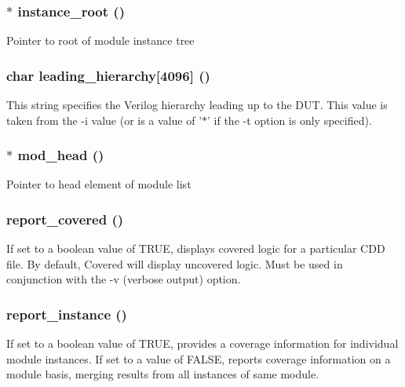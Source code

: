 \subsubsection{$\ast$ instance\_\-root ()}\label{toggle_8c_a0}


Pointer to root of module instance tree 
\subsubsection{\setlength{\rightskip}{0pt plus 5cm}char leading\_\-hierarchy[4096] ()}\label{toggle_8c_a4}


This string specifies the Verilog hierarchy leading up to the DUT. This value is taken from the -i value (or is a value of '$\ast$' if the -t option is only specified). 
\subsubsection{$\ast$ mod\_\-head ()}\label{toggle_8c_a1}


Pointer to head element of module list 
\subsubsection{ report\_\-covered ()}\label{toggle_8c_a2}


If set to a boolean value of TRUE, displays covered logic for a particular CDD file. By default, Covered will display uncovered logic. Must be used in conjunction with the -v (verbose output) option. 
\subsubsection{ report\_\-instance ()}\label{toggle_8c_a3}


If set to a boolean value of TRUE, provides a coverage information for individual module instances. If set to a value of FALSE, reports coverage information on a module basis, merging results from all instances of same module. 